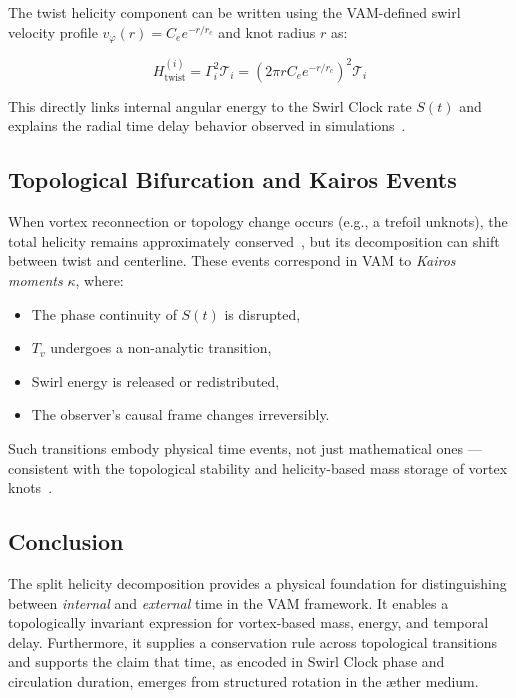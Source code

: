 \documentclass[12pt]{article}
\begin{document}
  The twist helicity component can be written using the VAM-defined swirl velocity profile $v_\varphi(r) = C_e e^{-r/r_c}$ and knot radius $r$ as:

  \begin{equation}
    H_\text{twist}^{(i)} = \Gamma_i^2 \mathcal{T}_i = \left(2\pi r C_e e^{-r/r_c}\right)^2 \mathcal{T}_i
  \end{equation}

  This directly links internal angular energy to the Swirl Clock rate $S(t)$ and explains the radial time delay behavior observed in simulations~\cite{VAM2}.

  \subsection*{Topological Bifurcation and Kairos Events}

  When vortex reconnection or topology change occurs (e.g., a trefoil unknots), the total helicity remains approximately conserved~\cite{Tao2021}, but its decomposition can shift between twist and centerline. These events correspond in VAM to \emph{Kairos moments} $\kappa$, where:

  \begin{itemize}
    \item The phase continuity of $S(t)$ is disrupted,
    \item $T_v$ undergoes a non-analytic transition,
    \item Swirl energy is released or redistributed,
    \item The observer’s causal frame changes irreversibly.
  \end{itemize}

  Such transitions embody physical time events, not just mathematical ones — consistent with the topological stability and helicity-based mass storage of vortex knots~\cite{SwirlGravity}.

  \subsection*{Conclusion}

  The split helicity decomposition provides a physical foundation for distinguishing between \emph{internal} and \emph{external} time in the VAM framework. It enables a topologically invariant expression for vortex-based mass, energy, and temporal delay. Furthermore, it supplies a conservation rule across topological transitions and supports the claim that time, as encoded in Swirl Clock phase and circulation duration, emerges from structured rotation in the æther medium.
\end{document}
